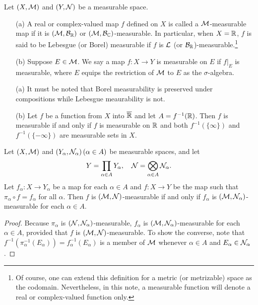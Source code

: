 \begin{defi}
    Let $(X, {\mathcal{M}})$ and $(Y, {\mathcal{N}})$ be a measurable space.
    \begin{enumerate}
        \item[(a)]
        {
            A real or complex-valued map $f$ defined on $X$ is called a ${\mathcal{M}}$-measurable map if it is $({\mathcal{M}}, {\mathcal{B}}_{{\mathbb{R}}})$ or $({\mathcal{M}}, {\mathcal{B}}_{{\mathbb{C}}})$-measurable.
            In particular, when $X={\mathbb{R}}$, $f$ is said to be Lebesgue (or Borel) measurable if $f$ is ${\mathcal{L}}$ (or ${\mathcal{B}}_{{\mathbb{R}}}$)-measurable.\footnote{Of course, one can extend this definition for a metric (or metrizable) space as the codomain. Nevertheless, in this note, a measurable function will denote a real or complex-valued function only.}
        }
        \item[(b)]
        {
            Suppose $E\in{\mathcal{M}}$.
            We say a map $f: X\rightarrow Y$ is measurable on $E$ if $f|_E$ is measurable, where $E$ equips the restriction of ${\mathcal{M}}$ to $E$ as the $\sigma$-algebra.
        }
    \end{enumerate}
\end{defi}
\begin{rmk}
    \begin{enumerate}
        \item[(a)]
        {
            It must be noted that Borel measurability is preserved under compositions while Lebesgue meaurability is not.
        }
        \item[(b)]
        {
            Let $f$ be a function from $X$ into $\overline{{\mathbb{R}}}$ and let $A=f^{-1}({\mathbb{R}})$.
            Then $f$ is measurable if and only if $f$ is measurable on ${\mathbb{R}}$ and both $f^{-1}(\{\infty\})$ and $f^{-1}(\{-\infty\})$ are measurable sets in $X$.
        }
    \end{enumerate}
\end{rmk}

\begin{prop}
    Let $(X, {\mathcal{M}})$ and $(Y_\alpha, {\mathcal{N}}_\alpha)\,(\alpha\in A)$ be measurable spaces, and let
    \begin{align*}
        Y=\prod_{\alpha\in A}Y_\alpha,\quad{\mathcal{N}}=\bigotimes_{\alpha\in A}{\mathcal{N}}_\alpha.
    \end{align*}
    Let $f_\alpha: X\rightarrow Y_\alpha$ be a map for each $\alpha\in A$ and $f: X\rightarrow Y$ be the map such that $\pi_\alpha\circ f=f_\alpha$ for all $\alpha$.
    Then $f$ is $({\mathcal{M}}, {\mathcal{N}})$-measurable if and only if $f_\alpha$ is $({\mathcal{M}}, {\mathcal{N}}_\alpha)$-measurable for each $\alpha\in A$.
\end{prop}
\begin{proof}
    Because $\pi_\alpha$ is $({\mathcal{N}}, {\mathcal{N}}_\alpha)$-measurable, $f_\alpha$ is $({\mathcal{M}}, {\mathcal{N}}_\alpha)$-measurable for each $\alpha\in A$, provided that $f$ is $({\mathcal{M}}, {\mathcal{N}})$-measurable.
    To show the converse, note that $f^{-1}(\pi_\alpha^{-1}(E_\alpha))=f_\alpha^{-1}(E_\alpha)$ is a member of ${\mathcal{M}}$ whenever $\alpha\in A$ and $E_\alpha\in{\mathcal{N}}_\alpha$.
\end{proof}

